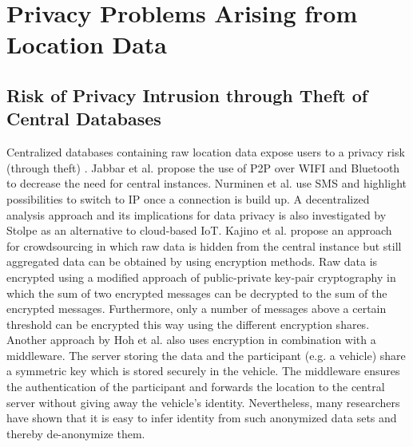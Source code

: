 \section{Privacy Problems Arising from Location Data}
\subsection{Risk of Privacy Intrusion through Theft of Central Databases}
Centralized databases containing raw location data expose users to a privacy risk (through theft) \parencite{iot, hoh2006enhancing}. Jabbar et al. \parencite{p2p-android} propose the use of P2P over WIFI and Bluetooth to decrease the need for central instances. Nurminen et al. \parencite{nurminen2006p2p} use SMS and highlight possibilities to switch to IP once a connection is build up. A decentralized analysis approach and its implications for data privacy is also investigated by Stolpe \parencite{iot} as an alternative to cloud-based IoT.
Kajino et al. \parencite{crowdsourcing} propose an approach for crowdsourcing in which raw data is hidden from the central instance but still aggregated data can be obtained by using encryption methods. Raw data is encrypted using a modified approach of public-private key-pair cryptography in which the sum of two encrypted messages can be decrypted to the sum of the encrypted messages. Furthermore, only a number of messages above a certain threshold can be encrypted this way using the different encryption shares.
Another approach by Hoh et al. \parencite{hoh2006enhancing} also uses encryption in combination with a middleware. The server storing the data and the participant (e.g. a vehicle) share a symmetric key which is stored securely in the vehicle. The middleware ensures the authentication of the participant and forwards the location to the central server without giving away the vehicle's identity. Nevertheless, many researchers \parencite{krumm, twitter, cellphone} have shown that it is easy to infer identity from such anonymized data sets and thereby de-anonymize them.

